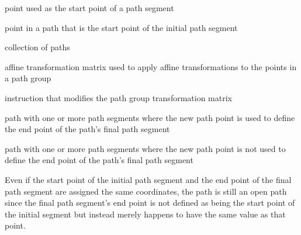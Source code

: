%
point used as the start point of a path segment

%
point in a path that is the start point of the initial path segment

%
collection of paths

%
affine transformation matrix used to apply affine transformations to the points in a path group

%
instruction that modifies the path group transformation matrix

%
path with one or more path segments where the new path point is used to define the end point of the path's final path segment

%
path with one or more path segments where the new path point is not used to define the end point of the path's final path segment
\begin{note}
Even if the start point of the initial path segment and the end point of the final path segment are assigned the same coordinates, the path is still an open path since the final path segment's end point is not defined as being the start point of the initial segment but instead merely happens to have the same value as that point.
\end{note}
